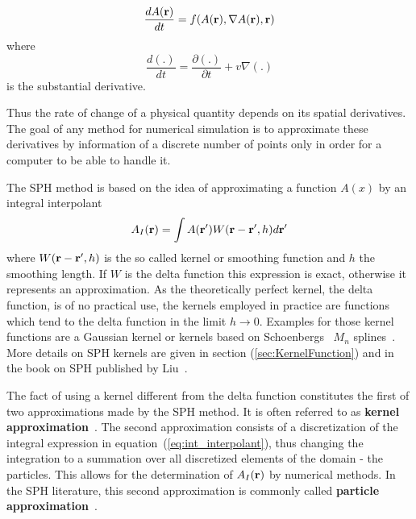 \documentclass{report}
\begin{document}
\begin {equation}
\label{eq:EFD_form}
{\frac{dA({\bf r})}{dt}}=f(A({\bf r}),\nabla A({\bf r}),{\bf r})
\end {equation}
where
\begin {equation}
{\frac{d(.)}{dt}}={\frac{\partial(.)}{ \partial t}}+v\nabla(.)
\end{equation}
is the substantial derivative.

Thus the rate of change of a physical quantity depends on its spatial
derivatives. The goal of any method for numerical simulation is to approximate
these derivatives by information of a discrete number of points only in order for a
computer to be able to handle it. 

The SPH method is based on the idea of approximating a function $A(x)$ by an
integral interpolant
\begin{equation}
\label{eq:int_interpolant}
A_I({\bf r})=\int A({\bf r'})W({\bf r}-{\bf r'},h)d{\bf r'}
\end{equation}
where $W({\bf r}-{\bf r'},h)$ is the so called kernel or smoothing function and $h$ the
smoothing length. If $W$ is the delta function this expression is exact,
otherwise it represents an approximation. As the theoretically
perfect kernel, the delta function, is of no practical use, the kernels
employed in practice are functions which tend to the delta function in the 
limit $h\rightarrow 0$.
Examples for those kernel functions are a Gaussian kernel or
kernels based on Schoenbergs~\cite{Schoenberg1946} $M_n$ splines~\cite{Monaghan2005}.
More details on SPH kernels are given in section
(\ref{sec:KernelFunction}) and in the book on SPH published by Liu~\cite{Liu2003}.

The fact of using a kernel different from the delta function constitutes the
first of two approximations made by the SPH
method. It is often referred to as {\bf kernel approximation}~\cite{Liu2003}.
The second approximation consists of a discretization of the integral
expression in equation~(\ref{eq:int_interpolant}), thus changing the integration
to a summation over all discretized elements of the domain - the particles. 
This allows for the determination of $A_I(\bf{r})$ by numerical methods. In the SPH
literature, this second approximation is commonly called {\bf particle
approximation}~\cite{Liu2003}.
\end{document}
